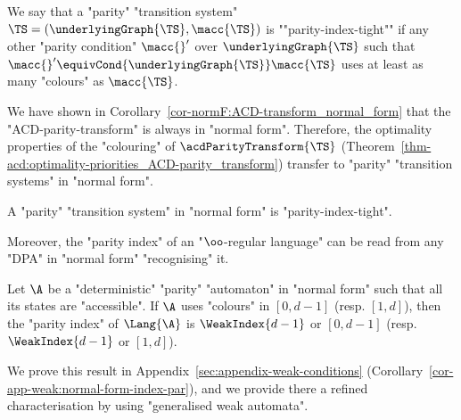 \documentclass[10pt,a4paper]{amsart}
\begin{document}



\begin{definition}\label{def:parity_tight_TS}
	\AP We say that a "parity" "transition system" $\TS = (\underlyingGraph{\TS}, \macc{\TS})$ is ""parity-index-tight"" if any other "parity condition" $\macc{}'$ over $\underlyingGraph{\TS}$ such that $\macc{}' \equivCond{\underlyingGraph{\TS}} \macc{\TS}$ uses at least as many "colours" as $\macc{\TS}$.
\end{definition}


We have shown in Corollary~\ref{cor-normF:ACD-transform_normal_form} that the "ACD-parity-transform" is always in "normal form". Therefore, the optimality properties of the "colouring" of $\acdParityTransform{\TS}$ (Theorem~\ref{thm-acd:optimality-priorities_ACD-parity_transform}) transfer to "parity" "transition systems" in "normal form".

\begin{corollary}\label{lemma-normF:normal_form-implies-strong_parity_index}
	A "parity" "transition system" in "normal form" is "parity-index-tight".
\end{corollary}


Moreover, the "parity index" of an "$\oo$-regular language" can be read from any "DPA" in "normal form" "recognising" it.

\begin{corollary}
	Let $\A$ be a "deterministic" "parity" "automaton" in "normal form" such that all its states are "accessible". 
	If $\A$ uses "colours" in $[0,d-1]$ (resp. $[1,d]$), then the "parity index" of $\Lang{\A}$ is $\WeakIndex{d-1}$ or $[0,d-1]$ (resp. $\WeakIndex{d-1}$ or $[1,d]$).
\end{corollary}


We prove this result in Appendix~\ref{sec:appendix-weak-conditions} (Corollary~\ref{cor-app-weak:normal-form-index-par}), and we provide there a refined characterisation by using "generalised weak automata".
\end{document}

